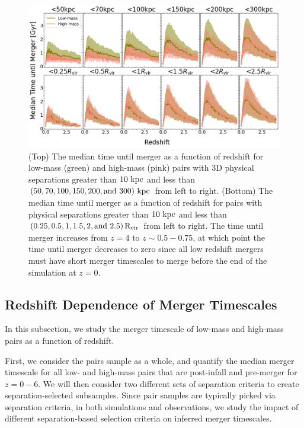 \documentclass[twocolumn,linenumbers]{aastex631}
\begin{document}
    \begin{figure}[htb]
        \centering
        \includegraphics[width=\textwidth]{plots/bet-on-it/3_time_til_merger.png}
        \caption{(Top) The median time until merger as a function of redshift for low-mass (green) and high-mass (pink) pairs with 3D physical separations greater than $10\,\mathrm{\,kpc}$ and less than $(50,70,100,150,200,\mbox{and }300)\,\mathrm{\,kpc}$ from left to right. 
        (Bottom) The median time until merger as a function of redshift for pairs with physical separations greater than $10\,\mathrm{\,kpc}$ and less than $(0.25, 0.5, 1, 1.5, 2,\mbox{and }2.5)\,\rm R_{vir}$ from left to right. 
        The time until merger increases from $z=4$ to $z\sim0.5-0.75$, at which point the time until merger decreases to zero since all low redshift mergers must have short merger timescales to merge before the end of the simulation at $z=0$. 
        }
        \label{fig:timescales-sep}
    \end{figure} 
    
\subsection{Redshift Dependence of Merger Timescales}\label{sec:results-timevredshift}
    In this subsection, we study the merger timescale of low-mass and high-mass pairs as a function of redshift. 
    
    First, we consider the pairs sample as a whole, and quantify the median merger timescale for all low- and high-mass pairs that are post-infall and pre-merger for $z=0-6$. 
    We will then consider two different sets of separation criteria to create separation-selected subsamples.
    Since pair samples are typically picked via separation criteria, in both simulations and observations, we study the impact of different separation-based selection criteria on inferred merger timescales.
    
\end{document}
